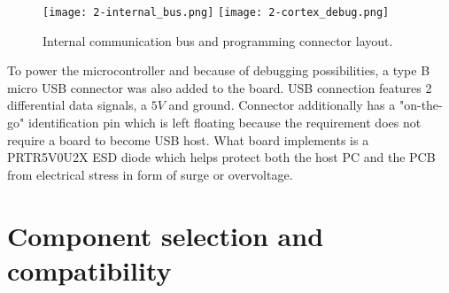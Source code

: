 \begin{figure}[h]
  \begin{center}
    \texttt{[image: 2-internal\_bus.png]}
    \hspace{1cm}
    \texttt{[image: 2-cortex\_debug.png]}
  \end{center}
  \caption{Internal communication bus and programming connector layout.}
  \label{fig:connectors}
\end{figure}


To power the microcontroller and because of debugging possibilities, a type B micro \ac{USB} connector was also added to the board. \ac{USB} connection features 2 differential data signals, a $5V$ and ground. Connector additionally has a "on-the-go" identification pin which is left floating because the requirement does not require a board to become \ac{USB} host. What board implements is a PRTR5V0U2X \ac{ESD} diode\cite{PRTR} which helps protect both the host \ac{PC} and the \ac{PCB} from electrical stress in form of surge or overvoltage.


\section{Component selection and compatibility}

